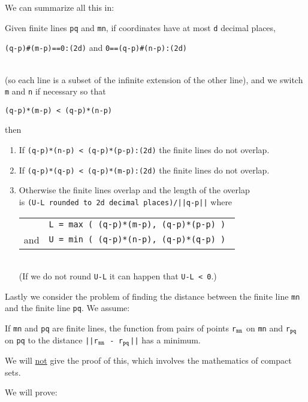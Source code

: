 \documentclass[12pt]{article}
\begin{document}
We can summarize all this in:
\begin{lemma}
Given finite lines {\tt pq} and {\tt mn},
if coordinates have at most {\tt d} decimal places,
\\[1ex]
\centerline{{\tt (q-p)\#(m-p)==0:(2d)} and {\tt 0==(q-p)\#(n-p):(2d)}}
\\[1ex]
(so each line is a subset of the infinite extension of the other line),
and we switch {\tt m} and {\tt n} if necessary so that \\
\centerline{\tt (q-p)*(m-p) < (q-p)*(n-p)}
then
\begin{enumerate}
\item If {\tt (q-p)*(n-p) < (q-p)*(p-p):(2d)} the finite lines do not overlap.
\item If {\tt (q-p)*(q-p) < (q-p)*(m-p):(2d)} the finite lines do not overlap.
\item Otherwise the finite lines overlap and the length of the overlap \\
is {\tt (U-L {\rm rounded to} {\tt 2d} {\rm decimal places})/||q-p||} where \\
\hspace*{0.5in}\begin{tabular}{rl}
	& \tt L = max ( (q-p)*(m-p), (q-p)*(p-p) ) \\
and	& \tt U = min ( (q-p)*(n-p), (q-p)*(q-p) ) \\
\end{tabular} \\
(If we do not round {\tt U-L} it can happen that {\tt U-L < 0}.)
\end{enumerate}
\end{lemma}


Lastly we consider the problem of finding the distance between
the finite line {\tt mn} and the finite line {\tt pq}.  We assume:

\begin{theorem}
If {\tt mn} and {\tt pq} are finite lines, the function from pairs
of points
{\tt r$_{\tt mn}$} on {\tt mn} and
{\tt r$_{\tt pq}$} on {\tt pq}  to the distance
{\tt ||r$_{\tt mn}$ - r$_{\tt pq}$||} has a minimum.
\end{theorem}

We will \underline{not} give the proof of this,
which involves the mathematics of compact sets.

We will prove:
\end{document}
